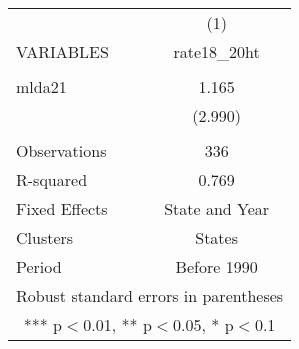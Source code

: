 \begin{tabular}{lc} \hline
 & (1) \\
VARIABLES & rate18\_20ht \\ \hline
 &  \\
mlda21 & 1.165 \\
 & (2.990) \\
 &  \\
Observations & 336 \\
R-squared & 0.769 \\
Fixed Effects & State and Year \\
Clusters & States \\
 Period & Before 1990 \\ \hline
\multicolumn{2}{c}{ Robust standard errors in parentheses} \\
\multicolumn{2}{c}{ *** p$<$0.01, ** p$<$0.05, * p$<$0.1} \\
\end{tabular}
